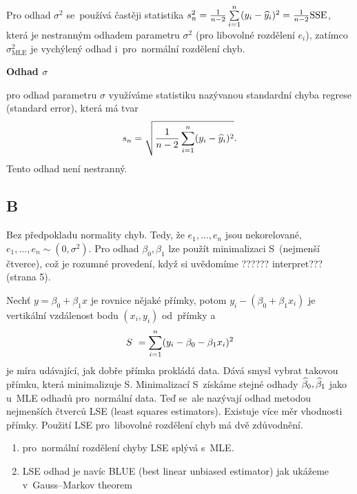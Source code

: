 \begin{remark}
Pro odhad $ \sigma^{2} $ se~používá častěji statistika $ s^{2}_{n} = \frac{1}{n - 2} \sum\limits_{i=1}^{n}(y_{i} -  \widehat{y}_{i})^{2} = \frac{1}{n-2} \text{SSE} $, která je nestranným odhadem parametru $ \sigma^{2} $ (pro libovolné rozdělení $ e_{i} $), zatímco $ \sigma^{2}_{\text{MLE}} $ je vychýlený odhad i~pro~normální rozdělení chyb.
\end{remark}
\textbf{Odhad $ \sigma $}

pro odhad parametru $ \sigma $ využíváme statistiku nazývanou standardní chyba regrese (standard error), která má tvar
$$
 s_{n} = \sqrt{\frac{1}{n-2} \sum\limits_{i=1}^{n}(y_{i} -  \widehat{y}_{i})^{2}}.
$$
Tento odhad není nestranný.

\subsection{B}
Bez předpokladu normality chyb. Tedy, že $ e_{1}, \dots , e_{n} $ jsou nekorelované, $ e_{1}, \dots , e_{n} \sim (0,\sigma^{2}) $.
Pro odhad $ \beta_{0}, \beta_{1} $ lze použít minimalizaci S~(nejmenší čtverce), což je rozumné provedení, když si uvědomíme ?????? interpret??? (strana 5).

Nechť $ y = \beta_{0} + \beta_{1} x  $ je rovnice nějaké přímky, potom $ y_{i} - (\beta_{0} + \beta_{1} x_{i}) $ je vertikální vzdálenost bodu $ (x_{i},y_{i}) $ od~přímky a~
$$
 S~= \sum\limits_{i=1}^{n} (y_{i} - \beta_{0} - \beta_{1} x_{i})^{2}
$$
je míra udávající, jak dobře přímka prokládá data. Dává smysl vybrat takovou přímku, která minimalizuje S. Minimalizací S~získáme stejné odhady $  \widehat{\beta}_{0}, \widehat{\beta}_{1} $ jako u~MLE odhadů pro~normální data. Teď se~ale nazývají odhad metodou nejmenších čtverců LSE (least squares estimators).
Existuje více měr vhodnosti přímky. Použití LSE pro~libovolné rozdělení chyb má dvě zdůvodnění.
\begin{enumerate}
  \item pro~normální rozdělení chyby LSE splývá s~MLE.
  \item LSE odhad je navíc BLUE (best linear unbiased estimator) jak ukážeme v~Gauss–Markov theorem
\end{enumerate}

